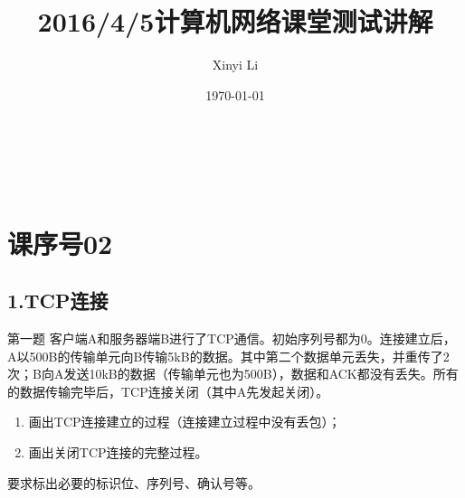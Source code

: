 \documentclass[presentation]{beamer}
\title[课堂测验题解]{2016/4/5计算机网络课堂测试讲解}
\author[\faEnvelope{} \href{mailto:cippusmcm@163.com}{\textit{i@xyli.me}}]{Xinyi Li}
\institute[]{\faChain{} \url{https://www.yangzhou301.com/2016/04/07/471457613/}}
\date{\today}
\begin{document}
	\linespread{1}
	{
		\begin{frame}[plain]
			\vspace{13em}
			\begin{titleBox}
				{\centering{\LARGE \inserttitle}
				}\\
				\insertinstitute \\ \faCalendarCheckO{ }\insertdate
			\end{titleBox}
		\end{frame}
	}
	\section{课序号02}
	\subsection{1.TCP连接}
	\begin{frame}{第一题}
		客户端A和服务器端B进行了TCP通信。初始序列号都为0。连接建立后，A以500B的传输单元向B传输5kB的数据。其中第二个数据单元丢失，并重传了2次；B向A发送10kB的数据（传输单元也为500B），数据和ACK都没有丢失。所有的数据传输完毕后，TCP连接关闭（其中A先发起关闭）。
		\begin{enumerate}
			\item 画出TCP连接建立的过程（连接建立过程中没有丢包）；
			\item 	画出关闭TCP连接的完整过程。
		\end{enumerate}
		要求标出必要的标识位、序列号、确认号等。
	\end{frame}
	
\end{document}
